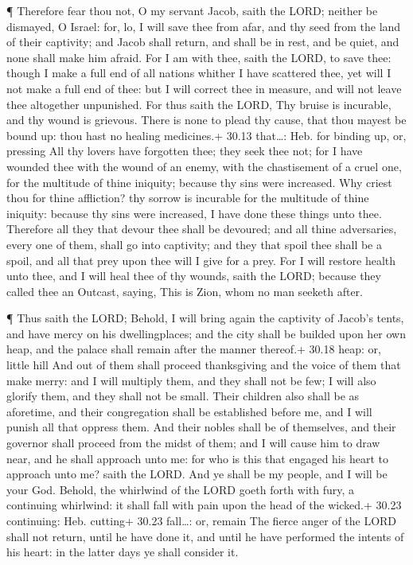  ¶ Therefore fear thou not, O my servant Jacob, saith the
LORD; neither be dismayed, O Israel: for, lo, I will save thee from
afar, and thy seed from the land of their captivity; and Jacob shall
return, and shall be in rest, and be quiet, and none shall make him
afraid.  For I am with thee, saith the LORD, to save thee:
though I make a full end of all nations whither I have scattered thee,
yet will I not make a full end of thee: but I will correct thee in
measure, and will not leave thee altogether unpunished. 
For thus saith the LORD, Thy bruise is incurable, and thy wound is
grievous.  There is none to plead thy cause, that thou
mayest be bound up: thou hast no healing medicines.+ 30.13 that\ldots:
Heb. for binding up, or, pressing  All thy lovers have
forgotten thee; they seek thee not; for I have wounded thee with the
wound of an enemy, with the chastisement of a cruel one, for the
multitude of thine iniquity; because thy sins were increased.
 Why criest thou for thine affliction? thy sorrow is
incurable for the multitude of thine iniquity: because thy sins were
increased, I have done these things unto thee.  Therefore
all they that devour thee shall be devoured; and all thine adversaries,
every one of them, shall go into captivity; and they that spoil thee
shall be a spoil, and all that prey upon thee will I give for a prey.
 For I will restore health unto thee, and I will heal thee
of thy wounds, saith the LORD; because they called thee an Outcast,
saying, This is Zion, whom no man seeketh after.

 ¶ Thus saith the LORD; Behold, I will bring again the
captivity of Jacob's tents, and have mercy on his dwellingplaces; and
the city shall be builded upon her own heap, and the palace shall remain
after the manner thereof.+ 30.18 heap: or, little hill  And
out of them shall proceed thanksgiving and the voice of them that make
merry: and I will multiply them, and they shall not be few; I will also
glorify them, and they shall not be small.  Their children
also shall be as aforetime, and their congregation shall be established
before me, and I will punish all that oppress them.  And
their nobles shall be of themselves, and their governor shall proceed
from the midst of them; and I will cause him to draw near, and he shall
approach unto me: for who is this that engaged his heart to approach
unto me? saith the LORD.  And ye shall be my people, and I
will be your God.  Behold, the whirlwind of the LORD goeth
forth with fury, a continuing whirlwind: it shall fall with pain upon
the head of the wicked.+ 30.23 continuing: Heb. cutting+ 30.23
fall\ldots: or, remain  The fierce anger of the LORD shall
not return, until he have done it, and until he have performed the
intents of his heart: in the latter days ye shall consider it.

